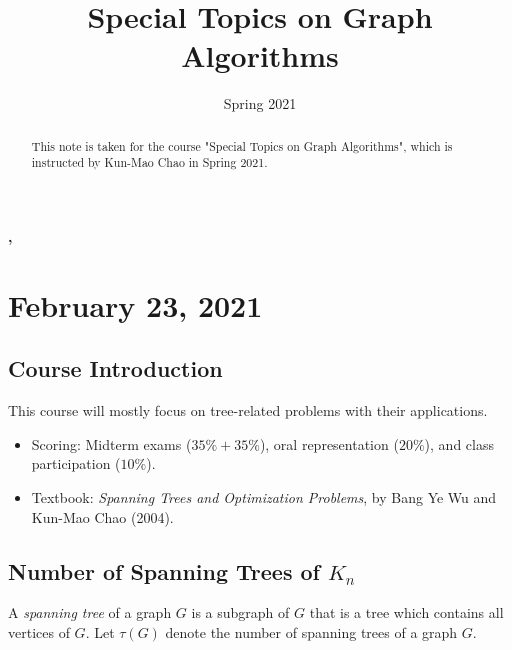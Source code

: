 \documentclass[11pt]{article}
\title{Special Topics on Graph Algorithms}
\date{Spring 2021}
\begin{document}
\begin{center}
  \LARGE \bfseries \thetitle, \thedate
\end{center}

\begin{abstract}
  This note is taken for the course "Special Topics on Graph Algorithms", which is instructed by Kun-Mao Chao in Spring 2021.
\end{abstract}

\tableofcontents

\section{February 23, 2021}
\subsection{Course Introduction}
This course will mostly focus on tree-related problems with their applications.
\begin{itemize}
  \item Scoring: Midterm exams ($35\%+35\%$), oral representation ($20\%$), and class participation ($10\%$).
  \item Textbook: \textsl{Spanning Trees and Optimization Problems}, by Bang Ye Wu and Kun-Mao Chao (2004).
\end{itemize}

\subsection{Number of Spanning Trees of $K_n$}
A \emph{spanning tree} of a graph $G$ is a subgraph of $G$ that is a tree which contains all vertices of $G$.
Let $\tau(G)$ denote the number of spanning trees of a graph $G$.
\end{document}
